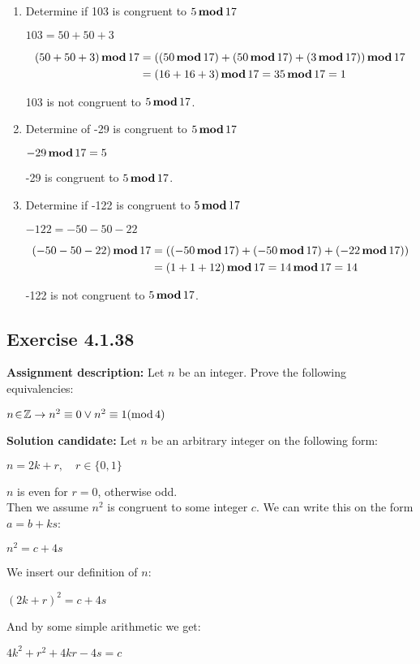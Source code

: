 \documentclass{report}
\newcommand{\cent}[1]{\begin{center}#1\end{center}}
\newcommand{\mAlign}[1]{\begin{align*}#1\end{align*}}
\newcommand{\doubleZ}{\mathbb{Z}}
\newcommand{\In}{\! \in \!}
\newcommand{\AssignmentDescription}{\textbf{Assignment description: }}
\newcommand{\Solution}{\textbf{Solution candidate: }}
\newcommand{\Exercise}[1]{\subsection{Exercise #1}}
\newcommand{\defaultEnumerateLabel}{\textbf{\alph*.}}
\newcommand{\modInline}{\text{mod\,}}
\newcommand{\modFunc}{\text{\,\textbf{mod}\,}}
\newcommand{\MyItem}[1]{\item #1\\}
\begin{document}
\begin{enumerate}[label=\defaultEnumerateLabel]
\begin{enumerate} [label=\defaultEnumerateLabel]
		80 is not congruent to $5 \modFunc 17$.\\
		
		\MyItem{Determine if 103 is congruent to $5 \modFunc 17$}
		
		\cent{$103 = 50 + 50 + 3$}
		\tiny
		\mAlign{(50+50+3) \modFunc 17 &= ((50 \modFunc 17) + (50 \modFunc 17) + (3 \modFunc 17)) \modFunc 17\\
						&= (16+16+3) \modFunc 17 = 35 \modFunc 17 = 1}
		\normalsize
		
		103 is not congruent to $5 \modFunc 17$.\\
		
		\MyItem{Determine of -29 is congruent to $5 \modFunc 17$}
		
		\cent{$-29 \modFunc 17 = 5$}
		
		-29 is congruent to $5 \modFunc 17$.\\
		
		\MyItem{Determine if -122 is congruent to $5 \modFunc 17$}
		
		\cent{$-122 = - 50 - 50 - 22$}
		
		\tiny
		\mAlign{(- 50 - 50 - 22) \modFunc 17 &= ((-50 \modFunc 17) +(-50 \modFunc 17) + (-22 \modFunc 17) )  \\
					&= (1+1+12) \modFunc 17 = 14 \modFunc 17 = 14 }
		\normalsize
		
		-122 is not congruent to $5 \modFunc 17$.\\
	\end{enumerate}
	
	\Exercise{4.1.38}
	\AssignmentDescription
	Let $n$ be an integer. Prove the following equivalencies:
	
	\cent{$n \In \doubleZ \to n^2 \equiv 0 \vee n^2 \equiv 1 (\modInline 4)$}
	
	\Solution
	Let $n$ be an arbitrary integer on the following form:
	
	\cent{$n = 2k + r, \quad r \in \{0,1\}$}
	
	$n$ is even for $r= 0$, otherwise odd.\\
	
	Then we assume $n^2$ is congruent to some integer $c$. We can write this on the form $a=b+ks$:
	
	\cent{$n^2 = c + 4s$}
	
	We insert our definition of $n$:
	
	\cent{$(2k+r)^2 = c + 4s$}
	
	And by some simple arithmetic we get:
	
	\cent{$4k^2 + r^2 + 4kr - 4s = c$}
	

\end{enumerate}
\end{document}
